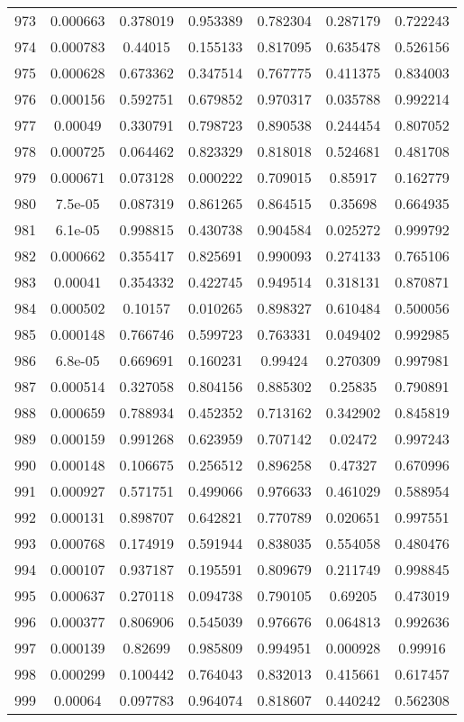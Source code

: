 \begin{table}
\begin{tabular}{c|c|c|c|c|c|c}
973 & 0.000663 & 0.378019 & 0.953389 & 0.782304 & 0.287179 & 0.722243\\
974 & 0.000783 & 0.44015 & 0.155133 & 0.817095 & 0.635478 & 0.526156\\
975 & 0.000628 & 0.673362 & 0.347514 & 0.767775 & 0.411375 & 0.834003\\
976 & 0.000156 & 0.592751 & 0.679852 & 0.970317 & 0.035788 & 0.992214\\
977 & 0.00049 & 0.330791 & 0.798723 & 0.890538 & 0.244454 & 0.807052\\
978 & 0.000725 & 0.064462 & 0.823329 & 0.818018 & 0.524681 & 0.481708\\
979 & 0.000671 & 0.073128 & 0.000222 & 0.709015 & 0.85917 & 0.162779\\
980 & 7.5e-05 & 0.087319 & 0.861265 & 0.864515 & 0.35698 & 0.664935\\
981 & 6.1e-05 & 0.998815 & 0.430738 & 0.904584 & 0.025272 & 0.999792\\
982 & 0.000662 & 0.355417 & 0.825691 & 0.990093 & 0.274133 & 0.765106\\
983 & 0.00041 & 0.354332 & 0.422745 & 0.949514 & 0.318131 & 0.870871\\
984 & 0.000502 & 0.10157 & 0.010265 & 0.898327 & 0.610484 & 0.500056\\
985 & 0.000148 & 0.766746 & 0.599723 & 0.763331 & 0.049402 & 0.992985\\
986 & 6.8e-05 & 0.669691 & 0.160231 & 0.99424 & 0.270309 & 0.997981\\
987 & 0.000514 & 0.327058 & 0.804156 & 0.885302 & 0.25835 & 0.790891\\
988 & 0.000659 & 0.788934 & 0.452352 & 0.713162 & 0.342902 & 0.845819\\
989 & 0.000159 & 0.991268 & 0.623959 & 0.707142 & 0.02472 & 0.997243\\
990 & 0.000148 & 0.106675 & 0.256512 & 0.896258 & 0.47327 & 0.670996\\
991 & 0.000927 & 0.571751 & 0.499066 & 0.976633 & 0.461029 & 0.588954\\
992 & 0.000131 & 0.898707 & 0.642821 & 0.770789 & 0.020651 & 0.997551\\
993 & 0.000768 & 0.174919 & 0.591944 & 0.838035 & 0.554058 & 0.480476\\
994 & 0.000107 & 0.937187 & 0.195591 & 0.809679 & 0.211749 & 0.998845\\
995 & 0.000637 & 0.270118 & 0.094738 & 0.790105 & 0.69205 & 0.473019\\
996 & 0.000377 & 0.806906 & 0.545039 & 0.976676 & 0.064813 & 0.992636\\
997 & 0.000139 & 0.82699 & 0.985809 & 0.994951 & 0.000928 & 0.99916\\
998 & 0.000299 & 0.100442 & 0.764043 & 0.832013 & 0.415661 & 0.617457\\
999 & 0.00064 & 0.097783 & 0.964074 & 0.818607 & 0.440242 & 0.562308\\
\end{tabular}
\end{table}